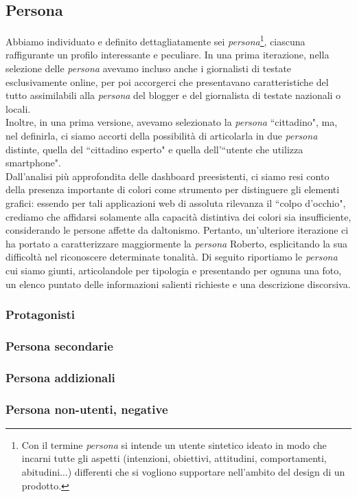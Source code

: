 \subsection{Persona}
Abbiamo individuato e definito dettagliatamente sei \textit{persona}\footnote{Con il termine \textit{persona} si intende un utente sintetico ideato in modo che incarni tutte gli aspetti (intenzioni, obiettivi, attitudini, comportamenti, abitudini...) differenti che si vogliono supportare nell'ambito del design di un prodotto.}, ciascuna raffigurante un profilo interessante e peculiare. 
\noindent
In una prima iterazione, nella selezione delle \textit{persona} avevamo incluso anche i giornalisti di testate esclusivamente online, per poi accorgerci che presentavano caratteristiche del tutto assimilabili alla \textit{persona} del blogger e del giornalista di testate nazionali o locali. \\ 
Inoltre, in una prima versione, avevamo selezionato la \textit{persona} ``cittadino", ma, nel definirla, ci siamo accorti della possibilità di articolarla in due \textit{persona} distinte, quella del ``cittadino esperto" e quella dell'``utente che utilizza smartphone".\\
Dall'analisi più approfondita delle dashboard preesistenti, ci siamo resi conto della presenza importante di colori come strumento per distinguere gli elementi grafici: essendo per tali applicazioni web di assoluta rilevanza il ``colpo d'occhio", crediamo che affidarsi solamente alla capacità distintiva dei colori sia insufficiente, considerando le persone affette da daltonismo. Pertanto, un'ulteriore iterazione ci ha portato a caratterizzare maggiormente la \textit{persona} Roberto, esplicitando la sua difficoltà nel riconoscere determinate tonalità.
\noindent
Di seguito riportiamo le \textit{persona} cui siamo giunti, articolandole per tipologia e presentando per ognuna una foto, un elenco puntato delle informazioni salienti richieste e una descrizione discorsiva.
\newpage
\subsubsection{Protagonisti}







\subsubsection{Persona secondarie}



\subsubsection{Persona addizionali}



\subsubsection{Persona non-utenti, negative}

